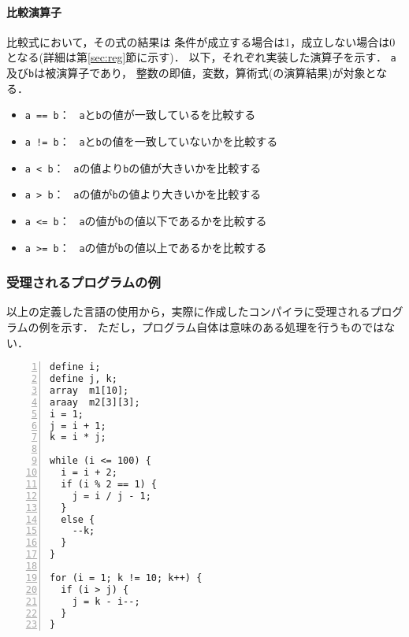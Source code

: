 \paragraph*{比較演算子}
比較式において，その式の結果は
条件が成立する場合は1，成立しない場合は0となる(詳細は第\ref{sec:reg}節に示す)．
以下，それぞれ実装した演算子を示す．
\verb|a|及び\verb|b|は被演算子であり，
整数の即値，変数，算術式(の演算結果)が対象となる．
\begin{itemize}
  \item \texttt{a == b}： \ \verb|a|と\verb|b|の値が一致しているを比較する
  \item \texttt{a != b}： \ \verb|a|と\verb|b|の値を一致していないかを比較する
  \item \texttt{a < b}： \ \verb|a|の値より\verb|b|の値が大きいかを比較する
  \item \texttt{a > b}： \ \verb|a|の値が\verb|b|の値より大きいかを比較する
  \item \texttt{a <= b}： \ \verb|a|の値が\verb|b|の値以下であるかを比較する     
  \item \texttt{a >= b}： \ \verb|a|の値が\verb|b|の値以上であるかを比較する     
\end{itemize}

\subsubsection{受理されるプログラムの例}
以上の定義した言語の使用から，実際に作成したコンパイラに受理されるプログラムの例を示す．
ただし，プログラム自体は意味のある処理を行うものではない．

\begin{Verbatim}[numbers=left, xleftmargin=10mm, numbersep=6pt, frame=single,
  fontsize=\small, baselinestretch=0.8]
define i;
define j, k;
array  m1[10];
araay  m2[3][3];
i = 1;
j = i + 1;
k = i * j;

while (i <= 100) {
  i = i + 2;
  if (i % 2 == 1) {
    j = i / j - 1;
  }
  else {
    --k;
  }
}

for (i = 1; k != 10; k++) {
  if (i > j) {
    j = k - i--;
  }
}
\end{Verbatim}


